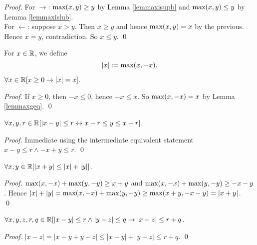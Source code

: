 \begin{proof}
  For $\rightarrow$: $\mbox{max}(x,y)\geq y$ by Lemma \ref{lemmaxisupb} and
  $\mbox{max}(x,y) \leq y$ by Lemma \ref{lemmaxislub}.\\
  For $\leftarrow$: suppose $x>y$. Then $x\geq y$ and hence
  $\mbox{max}(x,y) = x$ by the previous. Hence $x=y$, contradiction. So
  $x\leq y$.  \qed
\end{proof}

\begin{definition}\label{defabs}
For $x\in\mathbb{R}$, we define
$$|x| := \mbox{max}(x, -x).$$
\end{definition}

\begin{lemma} \label{lemabsid}
$\forall x\in \mathbb{R}[x\geq 0 \rightarrow |x|=x].$
\end{lemma}

\begin{proof}
If $x\geq 0$, then 
$-x \leq 0$, hence $-x\leq x$. So $\mbox{max}(x,-x)= x$ by Lemma 
\ref{lemmaxgeq}. 
\qed
\end{proof}

\begin{lemma}\label{lemabseps}
$\forall x,y,r\in\mathbb{R} [|x-y| \leq r \leftrightarrow x-r \leq y\leq x+r]$.
\end{lemma}

\begin{proof}
  Immediate using the intermediate equivalent statement $x-y\leq r
  \wedge -x+y \leq r$.  \qed
\end{proof}

\begin{lemma}\label{lemtriangle}
$\forall x,y\in\mathbb{R}[ |x+y| \leq |x|+|y|]$.
\end{lemma}

\begin{proof}
  $\mbox{max}(x,-x)+\mbox{max}(y,-y) \geq x+y$ and $\mbox{max}(x,-x)+\mbox{max}(y,-y) \geq
  -x-y$.  Hence $|x|+|y| = \mbox{max}(x,-x)+\mbox{max}(y,-y) \geq \mbox{max}(x+y,
  -x-y) = |x+y|$.  \qed
\end{proof}

\begin{lemma}\label{lemabsmin}
$\forall x,y,z,r,q\in\mathbb{R}[ |x-y|\leq r \wedge |y-z|\leq q \rightarrow |x-z|\leq r+q$. 
\end{lemma}

\begin{proof}
$|x-z| =|x-y+y-z| \leq |x-y|+|y-z| \leq r+q$.
\qed
\end{proof}

